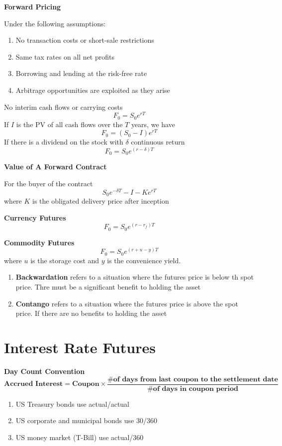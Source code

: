 \documentclass[11pt,fleqn]{report} %
\numberwithin{equation}{section} %
\numberwithin{figure}{section} %
\numberwithin{table}{section} %
\begin{document}
\begin{theorem}\textbf{Forward Pricing}

Under the following assumptions:
\begin{enumerate}
    \item No transaction costs or short-sale restrictions
    \item Same tax rates on all net profits
    \item Borrowing and lending at the risk-free rate
    \item Arbitrage opportunities are exploited as they arise
\end{enumerate}
No interim cash flows or carrying costs
$$
F_0=S_0e^{rT}
$$
If $I$ is the PV of all cash flows over the $T$ years, we have
$$
F_0=(S_0-I)e^{rT}
$$
If there is a dividend on the stock with $\delta$ continuous return
$$
F_0=S_0e^{(r-\delta)T}
$$
\end{theorem}
\begin{theorem}\textbf{Value of A Forward Contract}

For the buyer of the contract
$$
S_0e^{-\delta T}-I-Ke^{rT}
$$
where $K$ is the obligated delivery price after inception
\end{theorem}
\begin{theorem}\textbf{Currency Futures}
$$
F_0=S_0e^{(r-r_f)T}
$$
\end{theorem}
\begin{theorem}\textbf{Commodity Futures}
$$
F_0=S_0e^{(r+u-y)T}
$$
where $u$ is the storage cost and $y$ is the convenience yield.
\end{theorem}
\begin{definition}
\begin{enumerate}
    \item \textbf{Backwardation} refers to a situation where the futures price is below th spot price. Thre must be a significant benefit to holding the asset
    \item \textbf{Contango} refers to a situation where the futures price is above the spot price. If there are no benefits to holding the asset
\end{enumerate}
\end{definition}
\chapter{Interest Rate Futures}
 \begin{definition}\textbf{Day Count Convention}\\
 $$
 \textbf{Accrued Interest}=\textbf{Coupon}\times\frac{\textbf{\# of days from last coupon to the settlement date}}{\textbf{\# of days in coupon period}}
 $$
 \begin{enumerate}
     \item US Treasury bonds use actual/actual
     \item US corporate and municipal bonds use 30/360
     \item US money market (T-Bill) use actual/360
 \end{enumerate}
 \end{definition}
 
\end{document}

